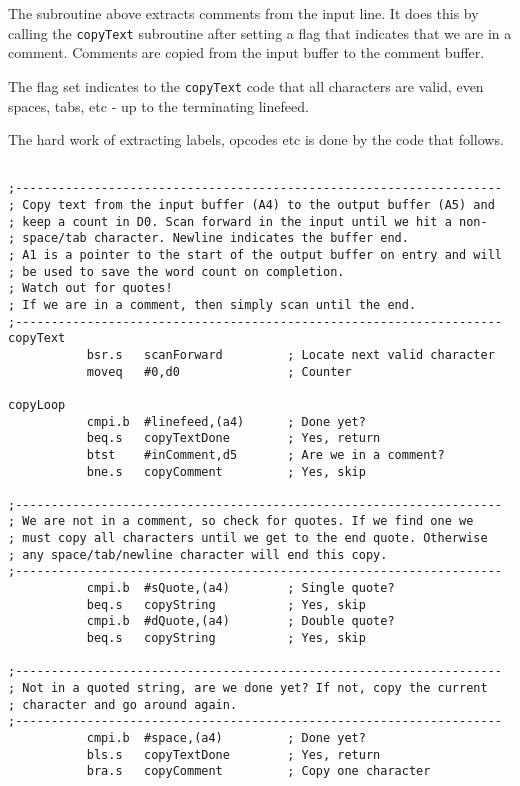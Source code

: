 The subroutine above extracts comments from the input line. It does this by calling the \texttt{copyText} subroutine after setting a flag that indicates that we are in a comment. Comments are copied from the input buffer to the comment buffer.

The flag set indicates to the \texttt{copyText} code that all characters are valid, even spaces, tabs, etc - up to the terminating linefeed.

The hard work of extracting labels, opcodes etc is done by the code that follows. 

\begin{lstlisting}[firstnumber=last,caption={ASMReformat Source - Copying Input Source Lines Around}]

;--------------------------------------------------------------------
; Copy text from the input buffer (A4) to the output buffer (A5) and
; keep a count in D0. Scan forward in the input until we hit a non-
; space/tab character. Newline indicates the buffer end.
; A1 is a pointer to the start of the output buffer on entry and will
; be used to save the word count on completion.
; Watch out for quotes!
; If we are in a comment, then simply scan until the end.
;--------------------------------------------------------------------
copyText
           bsr.s   scanForward         ; Locate next valid character
           moveq   #0,d0               ; Counter

copyLoop
           cmpi.b  #linefeed,(a4)      ; Done yet?
           beq.s   copyTextDone        ; Yes, return
           btst    #inComment,d5       ; Are we in a comment?
           bne.s   copyComment         ; Yes, skip

;--------------------------------------------------------------------
; We are not in a comment, so check for quotes. If we find one we 
; must copy all characters until we get to the end quote. Otherwise
; any space/tab/newline character will end this copy.
;--------------------------------------------------------------------
           cmpi.b  #sQuote,(a4)        ; Single quote?
           beq.s   copyString          ; Yes, skip
           cmpi.b  #dQuote,(a4)        ; Double quote?
           beq.s   copyString          ; Yes, skip

;--------------------------------------------------------------------
; Not in a quoted string, are we done yet? If not, copy the current
; character and go around again.
;--------------------------------------------------------------------
           cmpi.b  #space,(a4)         ; Done yet?
           bls.s   copyTextDone        ; Yes, return 
           bra.s   copyComment         ; Copy one character 


\end{lstlisting}
